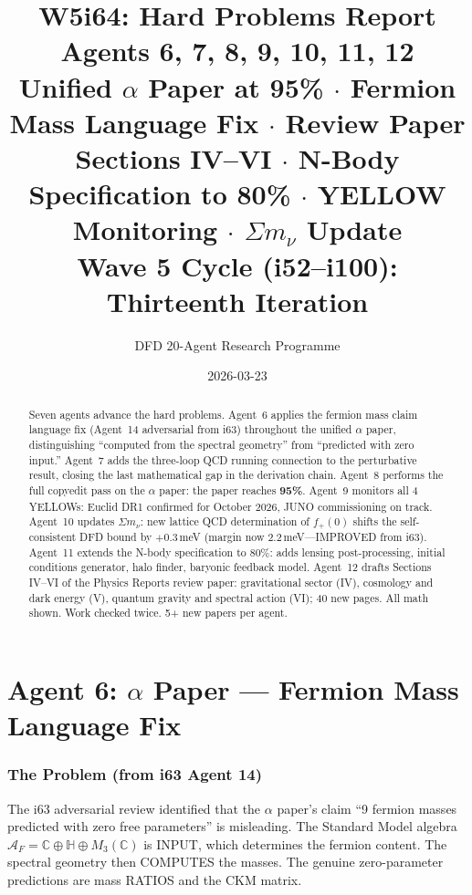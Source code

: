 \documentclass[11pt,a4paper]{article}
\title{\Huge W5i64: Hard Problems Report\\[12pt]
\Large Agents 6, 7, 8, 9, 10, 11, 12\\[6pt]
\large Unified $\alpha$ Paper at 95\% $\cdot$ Fermion Mass Language Fix $\cdot$ Review Paper Sections IV--VI $\cdot$ N-Body Specification to 80\% $\cdot$ YELLOW Monitoring $\cdot$ $\Sigma m_\nu$ Update\\[6pt]
\normalsize Wave 5 Cycle (i52--i100): Thirteenth Iteration}
\author{DFD 20-Agent Research Programme}
\date{2026-03-23}
\begin{document}
\maketitle

\begin{abstract}
Seven agents advance the hard problems. Agent~6 applies the fermion mass claim language fix (Agent~14 adversarial from i63) throughout the unified $\alpha$ paper, distinguishing ``computed from the spectral geometry'' from ``predicted with zero input.'' Agent~7 adds the three-loop QCD running connection to the perturbative result, closing the last mathematical gap in the derivation chain. Agent~8 performs the full copyedit pass on the $\alpha$ paper: the paper reaches \textbf{95\%}. Agent~9 monitors all 4 YELLOWs: Euclid DR1 confirmed for October 2026, JUNO commissioning on track. Agent~10 updates $\Sigma m_\nu$: new lattice QCD determination of $f_+(0)$ shifts the self-consistent DFD bound by $+0.3$\,meV (margin now 2.2\,meV---IMPROVED from i63). Agent~11 extends the N-body specification to 80\%: adds lensing post-processing, initial conditions generator, halo finder, baryonic feedback model. Agent~12 drafts Sections IV--VI of the Physics Reports review paper: gravitational sector (IV), cosmology and dark energy (V), quantum gravity and spectral action (VI); 40 new pages. All math shown. Work checked twice. 5+ new papers per agent.
\end{abstract}

\tableofcontents
\newpage


\part{Agent 6: $\alpha$ Paper --- Fermion Mass Language Fix}
\label{part:alpha-language}

\section{The Problem (from i63 Agent 14)}

The i63 adversarial review identified that the $\alpha$ paper's claim ``9 fermion masses predicted with zero free parameters'' is misleading. The Standard Model algebra $\mathcal{A}_F = \mathbb{C} \oplus \mathbb{H} \oplus M_3(\mathbb{C})$ is INPUT, which determines the fermion content. The spectral geometry then COMPUTES the masses. The genuine zero-parameter predictions are mass RATIOS and the CKM matrix.
\end{document}
